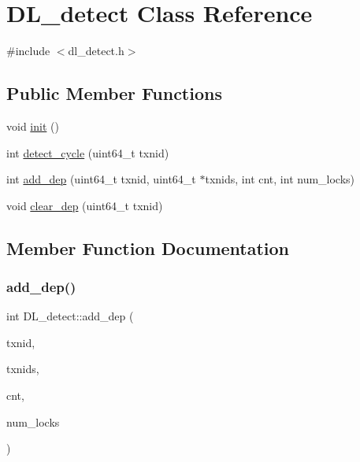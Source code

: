 \hypertarget{classDL__detect}{}\section{D\+L\+\_\+detect Class Reference}
\label{classDL__detect}


{\ttfamily \#include $<$dl\+\_\+detect.\+h$>$}

\subsection*{Public Member Functions}
\begin{DoxyCompactItemize}
\item 
void \hyperlink{classDL__detect_a3fcb32ea28c2e74ac8084b2c38cc3a47}{init} ()
\item 
int \hyperlink{classDL__detect_af6ce866812b9b2b1717e9248c5bb24ed}{detect\+\_\+cycle} (uint64\+\_\+t txnid)
\item 
int \hyperlink{classDL__detect_a2359a39da456e112cfebcd670ddab614}{add\+\_\+dep} (uint64\+\_\+t txnid, uint64\+\_\+t $\ast$txnids, int cnt, int num\+\_\+locks)
\item 
void \hyperlink{classDL__detect_ae24a28ca113a308b617bcd15180ad122}{clear\+\_\+dep} (uint64\+\_\+t txnid)
\end{DoxyCompactItemize}


\subsection{Member Function Documentation}
\mbox{\label{classDL__detect_a2359a39da456e112cfebcd670ddab614}} 
\subsubsection{\texorpdfstring{add\+\_\+dep()}{add\_dep()}}
{\footnotesize\ttfamily int D\+L\+\_\+detect\+::add\+\_\+dep (\begin{DoxyParamCaption}\item[{uint64\+\_\+t}]{txnid,  }\item[{uint64\+\_\+t $\ast$}]{txnids,  }\item[{int}]{cnt,  }\item[{int}]{num\+\_\+locks }\end{DoxyParamCaption})}

